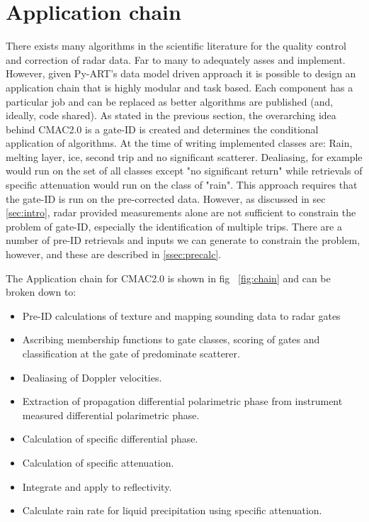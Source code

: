 \documentclass[twocol]{ametsoc}
\begin{document}
\section{Application chain}
There exists many algorithms in the scientific literature for the quality control and correction of radar data. Far to many to adequately 
asses and implement. However, given Py-ART's data model driven approach it is possible to design an application chain that is highly 
modular and task based. Each component has a particular job and can be replaced as better algorithms are published (and, ideally, code shared). 
As stated in the previous section, the overarching idea behind CMAC2.0 is a gate-ID is created and determines the conditional
 application of algorithms. At the time of writing implemented classes are: Rain, melting layer, ice, second trip and no significant 
 scatterer. Dealiasing, for example would run on the set of all classes except "no significant return" while retrievals of specific 
 attenuation would run on the class of "rain". This approach requires that the gate-ID is run on the pre-corrected data. However,
  as discussed in sec \ref{sec:intro}, radar provided measurements alone are not sufficient to constrain the problem of gate-ID, 
  especially the identification of multiple trips. There are a number of pre-ID retrievals and inputs we can generate to constrain
   the problem, however, and these are described in \ref{ssec:precalc}. 

The Application chain for CMAC2.0 is shown in fig ~\ref{fig:chain} and can be broken down to:
\begin{itemize}  
\item Pre-ID calculations of texture and mapping sounding data to radar gates
\item Ascribing membership functions to gate classes, scoring of gates and classification at the gate of predominate scatterer.
\item Dealiasing of Doppler velocities.
\item Extraction of propagation differential polarimetric phase from instrument measured differential polarimetric phase.
\item Calculation of specific differential phase.
\item Calculation of specific attenuation.
\item Integrate and apply to reflectivity.
\item Calculate rain rate for liquid precipitation using specific attenuation.
\end{itemize} 
\end{document}
